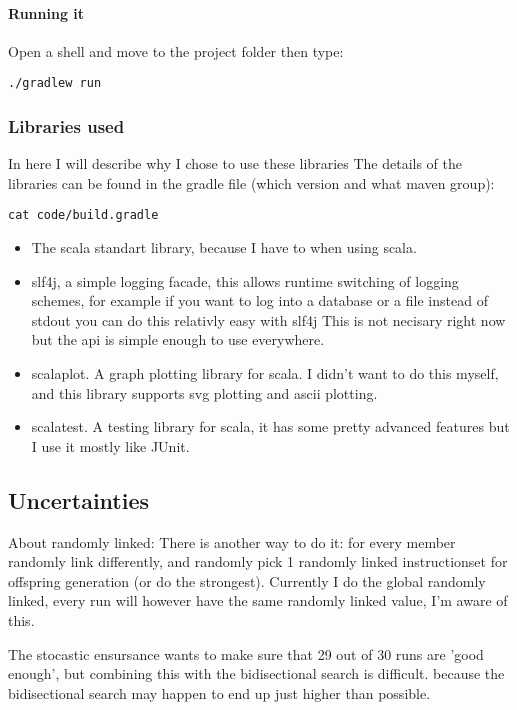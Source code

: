 \documentclass{article}
\begin{document}
\paragraph{Running it}

Open a shell and move to the project folder then type:

\lstset{language=Bash}
\begin{lstlisting}[frame=single]
	./gradlew run
\end{lstlisting}

\subsubsection{Libraries used}
In here I will describe why I chose to use these libraries
The details of the libraries can be found in the gradle file (which
version and what maven group):

\begin{lstlisting}[frame=single]
	cat code/build.gradle
\end{lstlisting}


\begin{itemize}
	\item The scala standart library, because I have to when using scala.
	\item slf4j, a simple logging facade, this allows runtime switching of
		logging schemes, for example if you want to log into a database or
		a file instead of stdout you can do this relativly easy with slf4j
		This is not necisary right now but the api is simple enough to use
		everywhere.
	\item scalaplot. A graph plotting library for scala. I didn't want to
		do this myself, and this library supports svg plotting and ascii
		plotting.
	\item scalatest. A testing library for scala, it has some pretty advanced
		features but I use it mostly like JUnit.
\end{itemize}
\subsection{Uncertainties}
About randomly linked:
	There is another way to do it: for every member randomly link
	differently, and randomly pick 1 randomly linked instructionset
	for offspring generation (or do the strongest).
	Currently I do the global randomly linked, every run will however
	have the same randomly linked value, I'm aware of this.

The stocastic ensursance wants to make sure that 29 out of 30 runs are
'good enough', but combining this with the bidisectional search is difficult.
because the bidisectional search may happen to end up just higher than possible.
\end{document}

